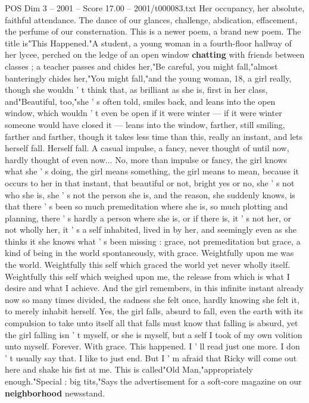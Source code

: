 \begin{textsample}{POS Dim 3 – 2001 – Score 17.00 – 2001/t000083.txt}
Her occupancy, her absolute, faithful attendance.
The dance of our glances, challenge, abdication, effacement, the perfume of our consternation.
This is a newer poem, a brand new poem.
The title is"This Happened."A student, a young woman in a fourth-floor hallway of her lycee, perched on the ledge of an open window \textbf{chatting} with friends between classes ; a teacher passes and chides her,"Be careful, you might fall,"almost banteringly chides her,"You might fall,"and the young woman, 18, a girl really, though she wouldn ' t think that, as brilliant as she is, first in her class, and"Beautiful, too,"she ' s often told, smiles back, and leans into the open window, which wouldn ' t even be open if it were winter — if it were winter someone would have closed it — leans into the window, farther, still smiling, farther and farther, though it takes less time than this, really an instant, and lets herself fall.
Herself fall.
A casual impulse, a fancy, never thought of until now, hardly thought of even now...
No, more than impulse or fancy, the girl knows what she ' s doing, the girl means something, the girl means to mean, because it occurs to her in that instant, that beautiful or not, bright yes or no, she ' s not who she is, she ' s not the person she is, and the reason, she suddenly knows, is that there ' s been so much premeditation where she is, so much plotting and planning, there ' s hardly a person where she is, or if there is, it ' s not her, or not wholly her, it ' s a self inhabited, lived in by her, and seemingly even as she thinks it she knows what ' s been missing : grace, not premeditation but grace, a kind of being in the world spontaneously, with grace.
Weightfully upon me was the world.
Weightfully this self which graced the world yet never wholly itself.
Weightfully this self which weighed upon me, the release from which is what I desire and what I achieve.
And the girl remembers, in this infinite instant already now so many times divided, the sadness she felt once, hardly knowing she felt it, to merely inhabit herself.
Yes, the girl falls, absurd to fall, even the earth with its compulsion to take unto itself all that falls must know that falling is absurd, yet the girl falling isn ' t myself, or she is myself, but a self I took of my own volition unto myself.
Forever.
With grace.
This happened.
I ' ll read just one more.
I don ' t usually say that.
I like to just end.
But I ' m afraid that Ricky will come out here and shake his fist at me.
This is called"Old Man,"appropriately enough."Special : big tits,"Says the advertisement for a soft-core magazine on our \textbf{neighborhood} newsstand.

\end{textsample}
